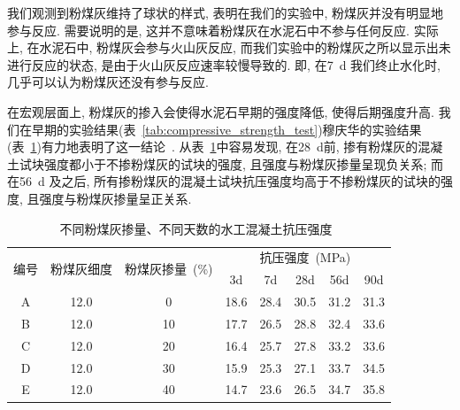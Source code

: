 我们观测到粉煤灰维持了球状的样式, 表明在我们的实验中, 粉煤灰并没有明显地参与反应. 需要说明的是, 这并不意味着粉煤灰在水泥石中不参与任何反应. 实际上, 在水泥石中, 粉煤灰会参与火山灰反应, 而我们实验中的粉煤灰之所以显示出未进行反应的状态, 是由于火山灰反应速率较慢导致的. 即, 在\SI{7}{\day} 我们终止水化时, 几乎可以认为粉煤灰还没有参与反应.

在宏观层面上, 粉煤灰的掺入会使得水泥石早期的强度降低, 使得后期强度升高. 我们在早期的实验结果(表~\ref{tab:compressive_strength_test})穆庆华的实验结果(表~\ref{tab:strength_fa})有力地表明了这一结论~\cite{mu_fa}. 从表~\ref{tab:strength_fa}中容易发现, 在\SI{28}{\day}前, 掺有粉煤灰的混凝土试块强度都小于不掺粉煤灰的试块的强度, 且强度与粉煤灰掺量呈现负关系; 而在\SI{56}{\day} 及之后, 所有掺粉煤灰的混凝土试块抗压强度均高于不掺粉煤灰的试块的强度, 且强度与粉煤灰掺量呈正关系.

\begin{table}[!t]
  \centering
  \caption{不同粉煤灰掺量、不同天数的水工混凝土抗压强度~\cite{mu_fa}}
  \begin{tabular}{|c|c|c|ccccc|}
    \hline
    \multirow{2}{*}{编号} & \multirow{2}{*}{粉煤灰细度} & \multirow{2}{*}{粉煤灰掺量~(\unit{\percent})} & \multicolumn{5}{c|}{抗压强度~(\unit{\mega\pascal})}                                                                  \\ \cline{4-8}
                          &                             &                                               & \multicolumn{1}{c|}{3d}   & \multicolumn{1}{c|}{7d}   & \multicolumn{1}{c|}{28d}  & \multicolumn{1}{c|}{56d}  & 90d  \\ \hline
    A                     & 12.0                        & 0                                             & \multicolumn{1}{c|}{18.6} & \multicolumn{1}{c|}{28.4} & \multicolumn{1}{c|}{30.5} & \multicolumn{1}{c|}{31.2} & 31.3 \\ \hline
    B                     & 12.0                        & 10                                            & \multicolumn{1}{c|}{17.7} & \multicolumn{1}{c|}{26.5} & \multicolumn{1}{c|}{28.8} & \multicolumn{1}{c|}{32.4} & 33.6 \\ \hline
    C                     & 12.0                        & 20                                            & \multicolumn{1}{c|}{16.4} & \multicolumn{1}{c|}{25.7} & \multicolumn{1}{c|}{27.8} & \multicolumn{1}{c|}{33.2} & 33.6 \\ \hline
    D                     & 12.0                        & 30                                            & \multicolumn{1}{c|}{15.9} & \multicolumn{1}{c|}{25.3} & \multicolumn{1}{c|}{27.1} & \multicolumn{1}{c|}{33.7} & 34.5 \\ \hline
    E                     & 12.0                        & 40                                            & \multicolumn{1}{c|}{14.7} & \multicolumn{1}{c|}{23.6} & \multicolumn{1}{c|}{26.5} & \multicolumn{1}{c|}{34.7} & 35.8 \\ \hline
  \end{tabular}

  \label{tab:strength_fa}
\end{table}

